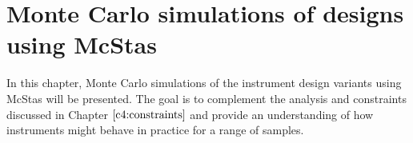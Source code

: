 \documentclass{article}
\begin{document}





\newpage
\section{Monte Carlo simulations of designs using McStas}
\label{c6:monte-carlo}
In this chapter, Monte Carlo simulations of the instrument design variants using McStas \cite{willendrup2020} will be presented. The goal is to complement the analysis and constraints discussed in Chapter $\ref{c4:constraints}$ and provide an understanding of how instruments might behave in practice for a range of samples. 

\end{document}
